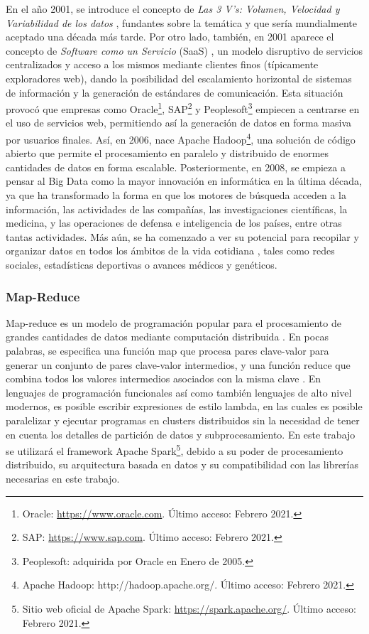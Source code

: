 \bigskip En el año 2001, se introduce el concepto de \textit{Las 3 V’s: Volumen, Velocidad y Variabilidad de los datos} \citep{laney20013d}, fundantes sobre la temática y que sería mundialmente aceptado una década más tarde. Por otro lado, también, en 2001 aparece el concepto de \textit{Software como un Servicio} (SaaS) \citep{hoch2001software}, un modelo disruptivo de servicios centralizados y acceso a los mismos mediante clientes finos (típicamente exploradores web), dando la posibilidad del escalamiento horizontal de sistemas de información y la generación de estándares de comunicación. Esta situación provocó que empresas como Oracle\footnote{Oracle: \url{https://www.oracle.com}. Último acceso: Febrero 2021.}, SAP\footnote{SAP: \url{https://www.sap.com}. Último acceso: Febrero 2021.} y Peoplesoft\footnote{Peoplesoft: adquirida por Oracle en Enero de 2005.} empiecen a centrarse en el uso de servicios web, permitiendo así la generación de datos en forma masiva por usuarios finales. Así, en 2006, nace Apache Hadoop\footnote{Apache Hadoop: http://hadoop.apache.org/. Último acceso: Febrero 2021.}, una solución de código abierto que permite el procesamiento en paralelo y distribuido de enormes cantidades de datos en forma escalable. Posteriormente, en 2008, se empieza a pensar al Big Data como la mayor innovación en informática en la última década, ya que ha transformado la forma en que los motores de búsqueda acceden a la información, las actividades de las compañías, las investigaciones científicas, la medicina, y las operaciones de defensa e inteligencia de los países, entre otras tantas actividades. Más aún, se ha comenzado a ver su potencial para recopilar y organizar datos en todos los ámbitos de la vida cotidiana \citep{bryant2008big}, tales como redes sociales, estadísticas deportivas o avances médicos y genéticos.

\subsubsection{Map-Reduce}
Map-reduce es un modelo de programación popular para el procesamiento de grandes cantidades de datos mediante computación distribuida \citep{condie2010mapreduce}.  En pocas palabras, se especifica una función map que procesa pares clave-valor para generar un conjunto de pares clave-valor intermedios, y una función reduce que combina todos los valores intermedios asociados con la misma clave \citep{dean2008mapreduce}.
En lenguajes de programación funcionales así como también lenguajes de alto nivel modernos, es posible escribir expresiones de estilo lambda, en las cuales es posible paralelizar y ejecutar programas en clusters distribuidos sin la necesidad de tener en cuenta los detalles de partición de datos y subprocesamiento.
\bigskip En este trabajo se utilizará el framework Apache Spark\footnote{Sitio web oficial de Apache Spark: \url{https://spark.apache.org/}. Último acceso: Febrero 2021.}, debido a su poder de procesamiento distribuido, su arquitectura basada en datos y su compatibilidad con las librerías necesarias en este trabajo.

